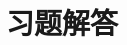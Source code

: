 \documentclass[UTF8,fontset=fandol,11pt]{ctexart}
\begin{document}
\makehandouttitle

\clearpage
\section*{习题解答}

\end{document}
